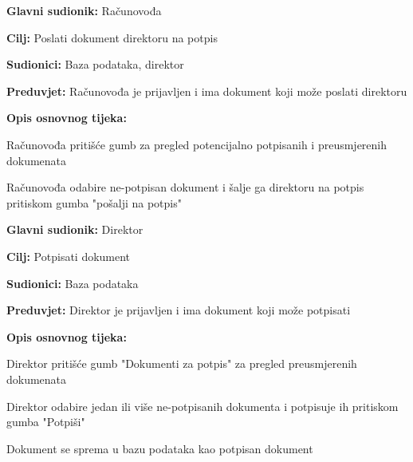 	\noindent {}
	\begin{packed_item}
		
		\item \textbf{Glavni sudionik: }Računovođa
		\item  \textbf{Cilj:} Poslati dokument direktoru na potpis
		\item  \textbf{Sudionici:} Baza podataka, direktor
		\item  \textbf{Preduvjet:} Računovođa je prijavljen i ima dokument koji može poslati direktoru
		\item  \textbf{Opis osnovnog tijeka:}
		
		\item[] \begin{packed_enum}
			
			\item Računovođa pritišće gumb za 
			pregled potencijalno potpisanih i preusmjerenih dokumenata
			\item Računovođa odabire ne-potpisan dokument i šalje ga direktoru na potpis pritiskom gumba "pošalji na potpis"
			
			
			
		\end{packed_enum}		
	\end{packed_item}
	
	\noindent \underbar{\textbf{UC6 - Potpis dokumenta}}
	\begin{packed_item}
		
		\item \textbf{Glavni sudionik: }Direktor
		\item  \textbf{Cilj:} Potpisati dokument
		\item  \textbf{Sudionici:} Baza podataka
		\item  \textbf{Preduvjet:} Direktor je prijavljen i ima dokument koji može potpisati
		\item  \textbf{Opis osnovnog tijeka:}
		
		\item[] \begin{packed_enum}
			
			\item Direktor pritišće gumb "Dokumenti za potpis" za 
			pregled preusmjerenih dokumenata
			\item Direktor odabire jedan ili više ne-potpisanih dokumenta i potpisuje ih pritiskom gumba "Potpiši"
			\item Dokument se sprema u bazu podataka kao potpisan dokument
			
			
		\end{packed_enum}		
	\end{packed_item}
	
